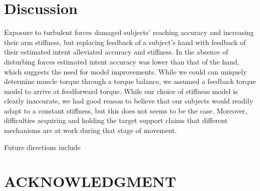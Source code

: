 \documentclass[letterpaper, 10 pt, conference]{ieeeconf}  %
\begin{document}
\section{Discussion}
Exposure to turbulent forces damaged subjects' reaching accuracy and increasing their arm stiffness, but replacing feedback of a subject's hand with feedback of their estimated intent alleviated accuracy and stiffness. In the absence of disturbing forces estimated intent accuracy was lower than that of the hand, which suggests the need for model improvements. While we could can uniquely determine muscle torque through a torque balance, we assumed a feedback torque model to arrive at feedforward torque. While our choice of stiffness model is clearly inaccurate, we had good reason to believe that our subjects would readily adapt to a constant stiffness, but this does not seems to be the case. Moreover, difficulties acquiring and holding the target support claims that different mechanisms are at work during that stage of movement\cite{niu2010temporal}. 

Future directions include

\section*{ACKNOWLEDGMENT}





\end{document}
